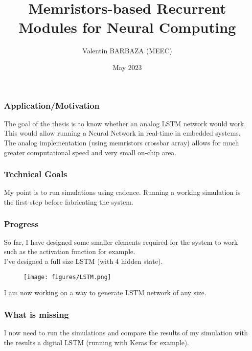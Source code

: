 \documentclass{beamer}
\title[MSc Thesis]
{Memristors-based Recurrent Modules for Neural Computing}
\institute[IST] %
{%
  Diogo Caetano\\
  INESC-MN
  \and%
  Ruxandra Barlulescu\\
  INESC-ID
}
\author[V. BARBAZA]{Valentin BARBAZA (MEEC)}
\date[2023] %
{May 2023}
\begin{document}
\frame{\titlepage}


\begin{frame}
\frametitle{Application/Motivation}
The goal of the thesis is to know whether an analog LSTM network would work. This would allow running a Neural Network in real-time in embedded systems. The analog implementation (using memristors crossbar array) allows for much greater computational speed and very small on-chip area.
\end{frame}
\begin{frame}
\frametitle{Technical Goals}
My point is to run simulations using cadence. Running a working simulation is the first step before fabricating the system.
\end{frame}
\begin{frame}
\frametitle{Progress}
So far, I have designed some smaller elements required for the system to work such as the activation function for example.\\
I've designed a full size LSTM (with 4 hidden state).
\begin{figure}
    \centering
    \texttt{[image: figures/LSTM.png]}
\end{figure}
I am now working on a way to generate LSTM network of any size.
\end{frame}

\begin{frame}
\frametitle{What is missing}
I now need to run the simulations and compare the results of my simulation with the results a digital LSTM (running with Keras for example).
\end{frame}
\end{document}
